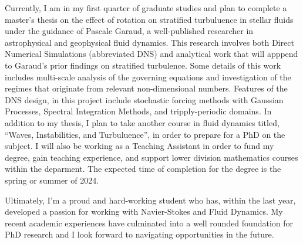 \documentclass{article}
\begin{document}
Currently, I am in my first quarter of graduate studies and plan to complete a master's thesis on the effect of rotation on stratified turbuluence in stellar fluids under the guidance of Pascale Garaud, a well-published researcher in astrophysical and geophysical fluid dynamics. This research involves both Direct Numerical Simulations (abbreviated DNS) and analytical work that will apppend to Garaud's prior findings on stratified turbulence. Some details of this work includes multi-scale analysis of the governing equations and investigation of the regimes that originate from relevant non-dimensional numbers. Features of the DNS design, in this project include stochastic forcing methods with Gaussian Processes, Spectral Integration Methods, and tripply-periodic domains. In addition to my thesis, I plan to take another course in fluid dynamics titled, ``Waves, Instabilities, and Turbuluence'', in order to prepare for a PhD on the subject. I will also be working as a Teaching Assistant in order to fund my degree, gain teaching experience, and support lower division mathematics courses within the deparment. The expected time of completion for the degree is the spring or summer of 2024. 


Ultimately, I'm a proud and hard-working student who has, within the last year, developed a passion for working with Navier-Stokes and Fluid Dynamics. My recent academic experiences have culminated into a well rounded foundation for PhD research and I look forward to navigating opportunities in the future. 

\end{document}
